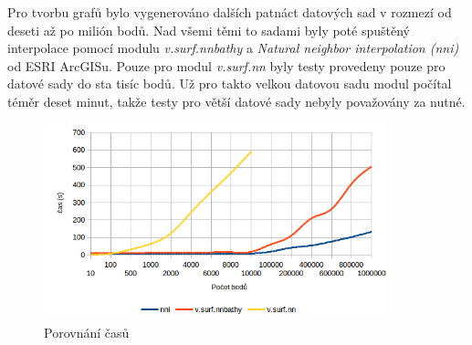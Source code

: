 \documentclass[12pt,a4paper]{article}
\begin{document}

\newpage
\begin{figure}[h!]
\centering
\begin{floatrow}
\end{floatrow}
\end{figure}

\newpage
Pro tvorbu grafů bylo vygenerováno dalších patnáct datových sad v rozmezí od deseti až po milión bodů. Nad všemi těmi to sadami byly poté spuštěný interpolace pomocí modulu \emph{v.surf.nnbathy} a \emph{Natural neighbor interpolation (nni)} od ESRI ArcGISu. Pouze pro modul \emph{v.surf.nn} byly testy provedeny pouze pro datové sady do sta tisíc bodů. Už pro takto velkou datovou sadu modul počítal téměr deset minut, takže testy pro větší datové sady nebyly považovány za nutné.

\begin{figure}[h!]
\centering
\includegraphics[width=0.9\textwidth]{img/graf.png}
\caption{Porovnání časů}
\label{fig:graf}
\end{figure}
\end{document}
